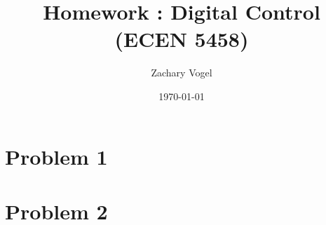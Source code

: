 \documentclass{article}
\title{Homework : Digital Control (ECEN 5458)}
\author{Zachary Vogel}
\date{\today}
\begin{document}
\maketitle

\section*{Problem 1}

\section*{Problem 2}
\end{document}

